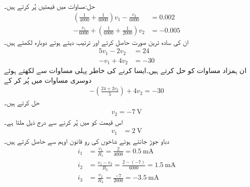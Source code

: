 حل:مساوات  میں قیمتیں پُر کرتے ہیں۔
\begin{align*}
\left( \frac{1}{4000}+\frac{1}{6000}\right) v_1 - \frac{v_2}{6000}&=0.002\\
-\frac{v_1}{6000}+\left(\frac{1}{6000}+\frac{1}{2000}\right)v_2&=-0.005
\end{align*}
ان کی سادہ ترین صورت حاصل کرتے اور ترتیب دیتے ہوئے دوبارہ لکھتے ہیں۔
\begin{align*}
5v_1-2v_2&=24\\
-v_1+4v_2&=-30
\end{align*}
ان ہمزاد مساوات کو حل کرتے ہیں۔ایسا کرنے کی خاطر پہلی مساوات سے   لکھتے ہوئے دوسری مساوات میں پُر کر کے
\begin{align*}
-\left(\frac{24+2v_2}{5}\right)+4v_2=-30
\end{align*}
حل کرتے ہیں۔
\begin{align*}
v_2=\SI{-7}{\volt}
\end{align*} 
اس قیمت کو  میں پُر کرنے سے درج ذیل ملتا ہے۔
\begin{align*}
v_1&=\SI{2}{\volt}
\end{align*}
دباو جوڑ جانتے ہوئے شاخوں کی رو قانون اوہم سے حاصل کرتے ہیں۔
\begin{align*}
i_1&=\frac{v_1}{R_1}=\frac{2}{4000}=\SI{0.5}{\milli\ampere}\\
i_2&=\frac{v_1-v_2}{R_2}=\frac{2-(-7)}{6000}=\SI{1.5}{\milli\ampere}\\
i_3&=\frac{v_2}{R_3}=\frac{-7}{2000}=\SI{-3.5}{\milli\ampere}
\end{align*}


